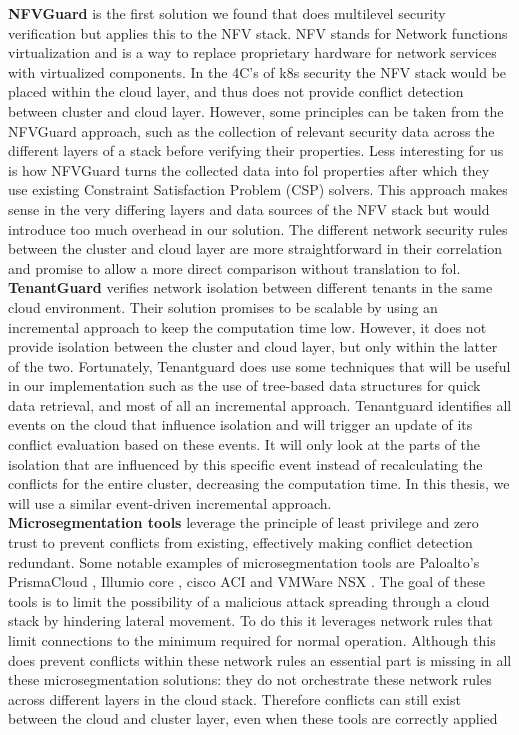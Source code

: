 \textbf{NFVGuard} \cite{nfvguard} is the first solution we found that does multilevel security verification but applies this to the NFV stack. NFV stands for Network functions virtualization and is a way to replace proprietary hardware for network services with virtualized components. In the 4C's of \acrshort{k8s} security the NFV stack would be placed within the cloud layer, and thus does not provide conflict detection between cluster and cloud layer. However, some principles can be taken from the NFVGuard approach, such as the collection of relevant security data across the different layers of a stack before verifying their properties. Less interesting for us is how NFVGuard turns the collected data into \acrfull{fol} properties after which they use existing Constraint Satisfaction Problem (CSP) solvers. This approach makes sense in the very differing layers and data sources of the NFV stack but would introduce too much overhead in our solution. The different network security rules between the cluster and cloud layer are more straightforward in their correlation and promise to allow a more direct comparison without translation to \acrshort{fol}.
\\[10pt]

\textbf{TenantGuard} \cite{tenantguard} verifies network isolation between different tenants in the same cloud environment. Their solution promises to be scalable by using an incremental approach to keep the computation time low. However, it does not provide isolation between the cluster and cloud layer, but only within the latter of the two. Fortunately, Tenantguard does use some techniques that will be useful in our implementation such as the use of tree-based data structures for quick data retrieval, and most of all an incremental approach. Tenantguard identifies all events on the cloud that influence isolation and will trigger an update of its conflict evaluation based on these events. It will only look at the parts of the isolation that are influenced by this specific event instead of recalculating the conflicts for the entire cluster, decreasing the computation time. In this thesis, we will use a similar event-driven incremental approach.
\\[10pt]

\textbf{Microsegmentation tools} leverage the principle of least privilege \cite{leastprivilige} and zero trust \cite{trust} to prevent conflicts from existing, effectively making conflict detection redundant. Some notable examples of microsegmentation tools are Paloalto's PrismaCloud \cite{prismacloud}, Illumio core \cite{illumio}, cisco ACI \cite{ciscoaci} and VMWare NSX \cite{vmwarensx}. The goal of these tools is to limit the possibility of a malicious attack spreading through a cloud stack by hindering lateral movement. To do this it leverages network rules that limit connections to the minimum required for normal operation. Although this does prevent conflicts within these network rules an essential part is missing in all these microsegmentation solutions: they do not orchestrate these network rules across different layers in the cloud stack. Therefore conflicts can  still exist between the cloud and cluster layer, even when these tools are correctly applied 

